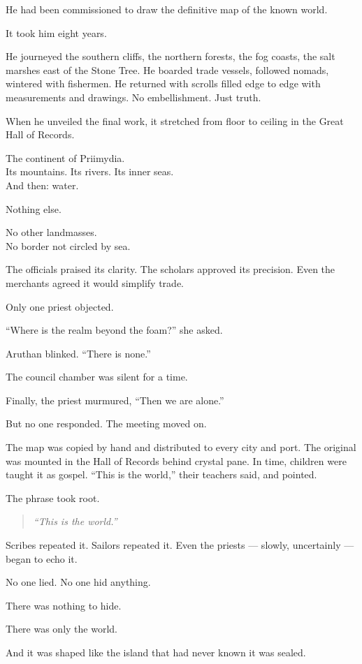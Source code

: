 \documentclass[9pt]{article}
\begin{document}
He had been commissioned to draw the definitive map of the known world.

It took him eight years.

He journeyed the southern cliffs, the northern forests, the fog coasts, the salt marshes east of the Stone Tree. He boarded trade vessels, followed nomads, wintered with fishermen. He returned with scrolls filled edge to edge with measurements and drawings. No embellishment. Just truth.

When he unveiled the final work, it stretched from floor to ceiling in the Great Hall of Records.

The continent of Priimydia.\\
Its mountains. Its rivers. Its inner seas.\\
And then: water.

Nothing else.

No other landmasses.\\
No border not circled by sea.

The officials praised its clarity. The scholars approved its precision. Even the merchants agreed it would simplify trade.

Only one priest objected.

``Where is the realm beyond the foam?'' she asked.

Aruthan blinked. ``There is none.''

The council chamber was silent for a time.

Finally, the priest murmured, ``Then we are alone.''

But no one responded. The meeting moved on.

The map was copied by hand and distributed to every city and port. The original was mounted in the Hall of Records behind crystal pane. In time, children were taught it as gospel. ``This is the world,'' their teachers said, and pointed.

The phrase took root.

\begin{quote}
\emph{``This is the world.''}
\end{quote}

Scribes repeated it. Sailors repeated it. Even the priests — slowly, uncertainly — began to echo it.

No one lied. No one hid anything.

There was nothing to hide.

There was only the world.

And it was shaped like the island that had never known it was sealed.
\end{document}
